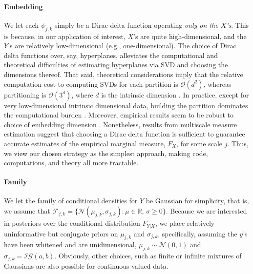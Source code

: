 \documentclass{article} %
\newcommand{\Real}{\mathbb{R}}
\providecommand{\mc}[1]{\mathcal{#1}}
\begin{document}
\paragraph{Embedding} We let each $\psi_{j,k}$ simply be a Dirac delta function operating \emph{only on the $X$'s}.  This is because, in our application of interest, $X$'s are quite high-dimensional, and the $Y$'s are relatively low-dimensional (e.g., one-dimensional).  The choice of Dirac delta functions over, say, hyperplanes, alleviates the computational and theoretical difficulties of estimating hyperplanes via SVD and choosing the dimensions thereof. That said,  theoretical considerations imply that the relative computation cost to computing SVDs for each partition is $\mc{O}(d^2)$, whereas partitioning  is  
$\mc{O}(3^d)$, where $d$ is the intrinsic dimension \cite{Allard2012}. In practice, except for very low-dimensional intrinsic dimensional data, building the partition dominates the computational burden \cite{Allard2012}.  Moreover, empirical results seem to be robust to choice of embedding dimension \cite{Lawlor2012}. Nonetheless, results from multiscale measure estimation \cite{ChenMaggioni12} suggest that choosing a Dirac delta function is sufficient to guarantee accurate estimates of the empirical marginal measure, $F_X$, for some scale $j$.  Thus, we view our chosen strategy as the simplest approach, making code, computations, and theory all more tractable.  


\paragraph{Family} We let the family of conditional densities for $Y$ be Gaussian for simplicity, that is, we assume that $\mc{F}_{j,k}=\{\mc{N}(\mu_{j,k}, {\sigma}_{j,k}) : \mu \in \Real, \, \sigma \geq 0\}$. Because we are interested in posteriors over the conditional distribution $F_{Y|X}$, we place relatively uninformative but conjugate priors on $\mu_{j,k}$ and ${\sigma}_{j,k}$, specifically, assuming the $y$'s have been whitened and are unidimensional,  
${\mu}_{j,k} \sim \mc{N}(0,1)$ and ${\sigma}_{j,k}=\mc{IG}(a,b)$.  
Obviously, other choices, such as finite or infinite mixtures of Gaussians are also possible for continuous valued data.  
\end{document}
